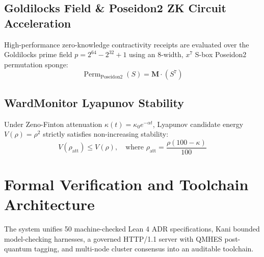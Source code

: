 \documentclass[11pt,a4paper]{article}
\begin{document}
\subsection{Goldilocks Field \& Poseidon2 ZK Circuit Acceleration}
High-performance zero-knowledge contractivity receipts are evaluated over the Goldilocks prime field $p = 2^{64} - 2^{32} + 1$ using an 8-width, $x^7$ S-box Poseidon2 permutation sponge:
\begin{equation}
\operatorname{Perm}_{\text{Poseidon2}}(S) = \mathbf{M} \cdot (S^7)
\end{equation}

\subsection{WardMonitor Lyapunov Stability}
Under Zeno-Finton attenuation $\kappa(t) = \kappa_0 e^{-\alpha t}$, Lyapunov candidate energy $V(\rho) = \rho^2$ strictly satisfies non-increasing stability:
\begin{equation}
V(\rho_{\text{att}}) \le V(\rho), \quad \text{where } \rho_{\text{att}} = \frac{\rho(100 - \kappa)}{100}
\end{equation}

\section{Formal Verification and Toolchain Architecture}
The system unifies 50 machine-checked Lean 4 ADR specifications, Kani bounded model-checking harnesses, a governed HTTP/1.1 server with QMHES post-quantum tagging, and multi-node cluster consensus into an auditable toolchain.
\end{document}
